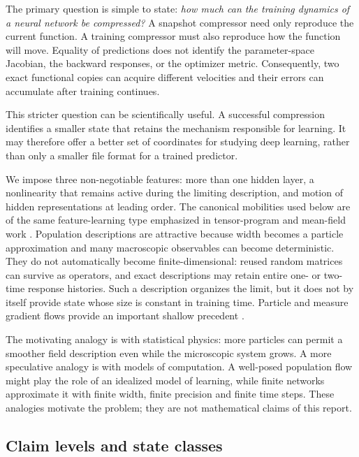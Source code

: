 \documentclass[11pt]{article}
\theoremstyle{definition}
\theoremstyle{remark}
\begin{document}
The primary question is simple to state:
\emph{how much can the training dynamics of a neural network be compressed?}
A snapshot compressor need only reproduce the current function.  A training
compressor must also reproduce how the function will move.  Equality of
predictions does not identify the parameter-space Jacobian, the backward
responses, or the optimizer metric.  Consequently, two exact functional copies
can acquire different velocities and their errors can accumulate after training
continues.

This stricter question can be scientifically useful.  A successful compression
identifies a smaller state that retains the mechanism responsible for learning.
It may therefore offer a better set of coordinates for studying deep learning,
rather than only a smaller file format for a trained predictor.

We impose three non-negotiable features: more than one hidden layer, a
nonlinearity that remains active during the limiting description, and motion of
hidden representations at leading order.  The canonical mobilities used below
are of the same feature-learning type emphasized in tensor-program and mean-field
work \citep{yang2021tensor,nguyen2023rigorous}.  Population descriptions are
attractive because width becomes a particle approximation and many macroscopic
observables can become deterministic.  They do not automatically become
finite-dimensional: reused random matrices can survive as operators, and exact
descriptions may retain entire one- or two-time response histories.  Such a
description organizes the limit, but it does not by itself provide state whose
size is constant in training time.  Particle and measure gradient flows provide
an important shallow precedent \citep{chizat2018global}.

The motivating analogy is with statistical physics: more particles can permit a
smoother field description even while the microscopic system grows.  A more
speculative analogy is with models of computation.  A well-posed population flow
might play the role of an idealized model of learning, while finite networks
approximate it with finite width, finite precision and finite time steps.  These
analogies motivate the problem; they are not mathematical claims of this report.

\subsection{Claim levels and state classes}
\end{document}
